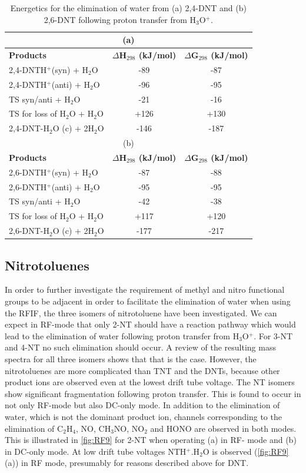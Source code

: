 \begin{table}%
\caption{Energetics for the elimination of water from (a) 2,4-DNT and (b) 2,6-DNT following proton transfer from H$_3$O$^+$.}
\label{table:RF:tab3}
\begin{tabular}{lcc}
\hline
\multicolumn{3}{c}{(a)}\\
\hline
\textbf{Products} & \textbf{$\Delta$H$_{298}$ (kJ/mol)} & \textbf{$\Delta$G$_{298}$ (kJ/mol)} \\
\hline
2,4-DNTH$^+$(syn) + H$_2$O        & -89  & -87  \\
2,4-DNTH$^+$(anti) + H$_2$O       & -96  & -95  \\
TS syn/anti + H$_2$O           & -21  & -16  \\
TS for loss of H$_2$O + H$_2$O & +126 & +130 \\
2,4-DNT-H$_2$O (c) + 2H$_2$O   & -146 & -187 \\
\hline
\multicolumn{3}{c}{(b)}\\
\hline
\textbf{Products} & \textbf{$\Delta$H$_{298}$ (kJ/mol)} & \textbf{$\Delta$G$_{298}$ (kJ/mol)} \\
\hline
2,6-DNTH$^+$(syn) + H$_2$O        & -87  & -88  \\
2,6-DNTH$^+$(anti) + H$_2$O       & -95  & -95  \\
TS syn/anti + H$_2$O           & -42  & -38  \\
TS for loss of H$_2$O + H$_2$O & +117 & +120 \\
2,6-DNT-H$_2$O (c) + 2H$_2$O   & -177 & -217 \\
\hline
\end{tabular}
\end{table}

\subsection{Nitrotoluenes}
In order to further investigate the requirement of methyl and nitro functional groups to be adjacent in order to facilitate the elimination of water when using the RFIF, the three isomers of nitrotoluene have been investigated. We can expect in RF-mode that only 2-NT should have a reaction pathway which would lead to the elimination of water following proton transfer from H$_3$O$^+$. For 3-NT and 4-NT no such elimination should occur. A review of the resulting mass spectra for all three isomers shows that that is the case. However, the nitrotoluenes are more complicated than TNT and the DNTs, because other product ions are observed even at the lowest drift tube voltage. The NT isomers show significant fragmentation following proton transfer. This is found to occur in not only RF-mode but also DC-only mode. In addition to the elimination of water, which is not the dominant product ion, channels corresponding to the elimination of C$_2$H$_4$, NO, CH$_3$NO, NO$_2$ and HONO are observed in both modes. This is illustrated in \autoref{fig:RF9} for 2-NT when operating (a) in RF- mode and (b) in DC-only mode. At low drift tube voltages NTH$^+$.H$_2$O is observed (\autoref{fig:RF9}(a)) in RF mode, presumably for reasons described above for DNT.

